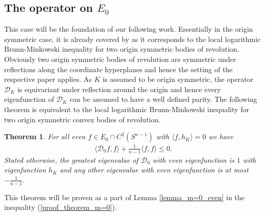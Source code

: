\documentclass[12pt,twoside]{amsart}
\numberwithin{satz}{section}
\newtheorem{theorem}[satz]{Theorem}
\theoremstyle{definition}
\numberwithin{equation}{section}
\begin{document}
	\subsection{The operator on $E_0$}\label{section_m=0}
	
	This case will be the foundation of our following work. Essentially in the origin symmetric case, it is already covered by \cite{boeroeczkykalantzopoulos} as it corresponds to the local logarithmic Brunn-Minkowski inequality for two origin symmetric bodies of revolution. Obviously two origin symmetric bodies of revolution are symmetric under reflections along the coordinate hyperplanes and hence the setting of the respective paper applies. As $K$ is assumed to be origin symmetric, the operator $\mathcal{D}_K$ is equivariant under reflection around the origin and hence every eigenfunction of $\mathcal{D}_K$ can be assumed to have a well defined parity. The following theorem is equivalent to the local logarithmic Brunn-Minkowski inequality for two origin symmetric convex bodies of revolution.
	
	\begin{theorem}\label{theorem_eigenvalues_m=0}
		For all even $f\in E_0\cap C^2(S^{n-1})$ with $\langle f,h_K\rangle=0$ we have
		\begin{align*}
			\langle \mathcal{D}_0f,f\rangle+\frac{1}{n-1}\langle f,f\rangle \leq 0.
		\end{align*}
		Stated otherwise, the greatest eigenvalue of $\mathcal{D}_0$ with even eigenfunction is $1$ with eigenfunction $h_K$ and any other eigenvalue with even eigenfunction is at most $-\frac{1}{n-1}$.
	\end{theorem}
	
	This theorem will be proven as a part of Lemma \ref{lemma_m=0_even} in the inequality (\ref{proof_theorem_m=0}).
\end{document}
